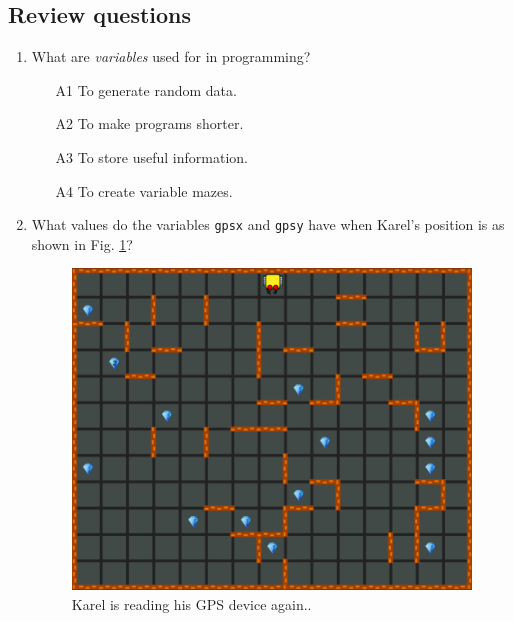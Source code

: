 \documentclass[article,A4,12pt]{llncs}
\begin{document}
{{{{\subsection{Review questions}

\begin{enumerate}
\item What are {\em variables} used for in programming? 
\begin{enumerate}
\item[A1] To generate random data.
\item[A2] To make programs shorter.
\item[A3] To store useful information.
\item[A4] To create variable mazes.
\end{enumerate}
\item What values do the variables {\tt gpsx} and {\tt gpsy} have when Karel's
position is as shown in Fig. \ref{fig:var2}?
\newpage
\begin{figure}[!ht]
\begin{center}
\includegraphics[height=0.4\textwidth]{img/variables2.png}
\end{center}
\vspace{-4mm}
\caption{Karel is reading his GPS device again..}
\label{fig:var2}
\end{figure}
\noindent


\end{enumerate}}}}}
\end{document}
